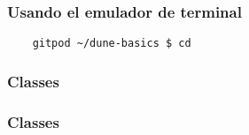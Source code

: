 \begin{frame}
	\frametitle{Usando el emulador de terminal}



\end{frame}

\begin{frame}

\end{frame}

\begin{frame}[fragile]
	\begin{lstlisting}
    gitpod ~/dune-basics $ cd
  \end{lstlisting}
\end{frame}


\begin{frame}[fragile]
	\frametitle{Classes}

	


\end{frame}

\begin{frame}[fragile]
	\frametitle{Classes}

	

\end{frame}

